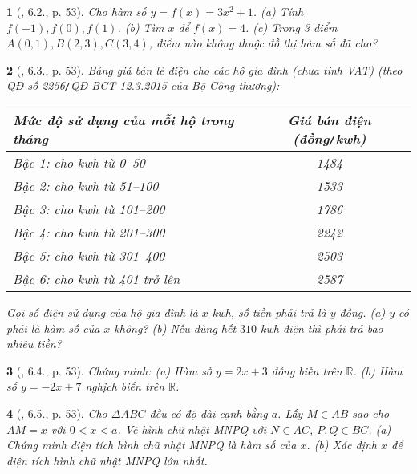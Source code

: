 \documentclass{article}
\newtheorem{baitoan}{}
\begin{document}
\begin{baitoan}[\cite{Binh_boi_duong_Toan_9_tap_1}, 6.2., p. 53]
	Cho hàm số $y = f(x) = 3x^2 + 1$. (a) Tính $f(-1),f(0),f(1)$. (b) Tìm $x$ để $f(x) = 4$. (c) Trong 3 điểm $A(0,1),B(2,3),C(3,4)$, điểm nào không thuộc đồ thị hàm số đã cho?
\end{baitoan}

\begin{baitoan}[\cite{Binh_boi_duong_Toan_9_tap_1}, 6.3., p. 53]
	Bảng giá bán lẻ điện cho các hộ gia đình (chưa tính {\rm VAT}) (theo QĐ số 2256{\tt/}QĐ-BCT 12.3.2015 của Bộ Công thương):
	\begin{table}[H]
		\centering
		\begin{tabular}{|l|c|}
			\hline
			Mức độ sử dụng của mỗi hộ trong tháng & Giá bán điện (đồng{\tt/}kwh) \\
			\hline
			Bậc 1: cho kwh từ 0--50 & 1484 \\
			\hline
			Bậc 2: cho kwh từ 51--100 & 1533 \\
			\hline
			Bậc 3: cho kwh từ 101--200 & 1786 \\
			\hline
			Bậc 4: cho kwh từ 201--300 & 2242 \\
			\hline
			Bậc 5: cho kwh từ 301--400 & 2503 \\
			\hline
			Bậc 6: cho kwh từ 401 trở lên & 2587 \\
			\hline
		\end{tabular}
	\end{table}
	\noindent Gọi số điện sử dụng của hộ gia đình là $x$ {\rm kwh}, số tiền phải trả là $y$ đồng. (a) $y$ có phải là hàm số của $x$ không? (b) Nếu dùng hết $310$ {\rm kwh} điện thì phải trả bao nhiêu tiền?
\end{baitoan}

\begin{baitoan}[\cite{Binh_boi_duong_Toan_9_tap_1}, 6.4., p. 53]
	Chứng minh: (a) Hàm số $y = 2x + 3$ đồng biến trên $\mathbb{R}$. (b) Hàm số $y = -2x + 7$ nghịch biến trên $\mathbb{R}$.
\end{baitoan}

\begin{baitoan}[\cite{Binh_boi_duong_Toan_9_tap_1}, 6.5., p. 53]
	Cho $\Delta ABC$ đều có độ dài cạnh bằng $a$. Lấy $M\in AB$ sao cho $AM = x$ với $0 < x < a$. Vẽ hình chữ nhật MNPQ với $N\in AC$, $P,Q\in BC$. (a) Chứng minh diện tích hình chữ nhật MNPQ là hàm số của $x$. (b) Xác định $x$ để diện tích hình chữ nhật MNPQ lớn nhất.
\end{baitoan}
\end{document}
